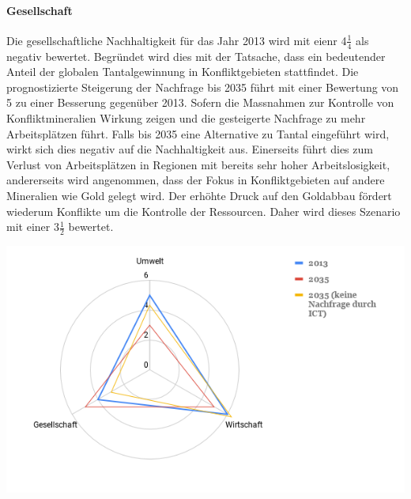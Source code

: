 \paragraph{Gesellschaft}
Die gesellschaftliche Nachhaltigkeit für das Jahr 2013 wird mit eienr 4\(\frac{1}{4}\) 
als negativ bewertet. Begründet wird dies mit der Tatsache, dass ein bedeutender Anteil 
der globalen Tantalgewinnung in Konfliktgebieten stattfindet. Die prognostizierte 
Steigerung der Nachfrage bis 2035 führt mit einer Bewertung von 5 zu einer 
Besserung gegenüber 2013. Sofern die Massnahmen zur Kontrolle von Konfliktmineralien 
Wirkung zeigen und die gesteigerte Nachfrage zu mehr Arbeitsplätzen führt. Falls bis
2035 eine Alternative zu Tantal eingeführt wird, wirkt sich dies negativ auf die 
Nachhaltigkeit aus. Einerseits führt dies zum Verlust von Arbeitsplätzen in Regionen
mit bereits sehr hoher Arbeitslosigkeit, andererseits wird angenommen, dass der 
Fokus in Konfliktgebieten auf andere Mineralien wie Gold gelegt wird. Der erhöhte Druck
auf den Goldabbau fördert wiederum Konflikte um die Kontrolle der Ressourcen. Daher 
wird dieses Szenario mit einer 3\(\frac{1}{2}\) bewertet.


\begin{center}
\includegraphics[width=14cm]{images/tantal-results}
\end{center}
